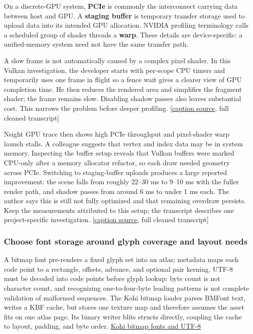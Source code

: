 \hypertarget{06-engine-ii-ch026-use-controlled-simplification-and-hardware-counters-to-find-a-gpu-bottleneck}{}

On a discrete-GPU system, \textbf{PCIe} is commonly the interconnect carrying data between host and GPU. A \textbf{staging buffer} is temporary transfer storage used to upload data into its intended GPU allocation. NVIDIA profiling terminology calls a scheduled group of shader threads a \textbf{warp}. These details are device-specific: a unified-memory system need not have the same transfer path.

A slow frame is not automatically caused by a complex pixel shader. In this Vulkan investigation, the developer starts with per-scope CPU timers and temporarily uses one frame in flight so a fence wait gives a clearer view of GPU completion time. He then reduces the rendered area and simplifies the fragment shader; the frame remains slow. Disabling shadow passes also leaves substantial cost. This narrows the problem before deeper profiling. {[}\href{https://www.youtube.com/watch?v=bUUZ1iD9_e4}{caption source}, full cleaned transcript{]}

Nsight GPU trace then shows high PCIe throughput and pixel-shader warp launch stalls. A colleague suggests that vertex and index data may be in system memory. Inspecting the buffer setup reveals that Vulkan buffers were marked CPU-only after a memory allocator refactor, so each draw needed geometry across PCIe. Switching to staging-buffer uploads produces a large reported improvement: the scene falls from roughly 22--30 ms to 9--10 ms with the fuller render path, and shadow passes from around 6 ms to under 1 ms each. The author says this is still not fully optimized and that remaining overdraw persists. Keep the measurements attributed to this setup; the transcript describes one project-specific investigation. {[}\href{https://www.youtube.com/watch?v=bUUZ1iD9_e4}{caption source}, full cleaned transcript{]}

\subsubsection{Choose font storage around glyph coverage and layout needs}\label{06-engine-ii-ch026-choose-font-storage-around-glyph-coverage-and-layout-needs}

\hypertarget{06-engine-ii-ch026-choose-font-storage-around-glyph-coverage-and-layout-needs}{}

A bitmap font pre-renders a fixed glyph set into an atlas; metadata maps each code point to a rectangle, offsets, advance, and optional pair kerning. UTF-8 must be decoded into code points before glyph lookup: byte count is not character count, and recognizing one-to-four-byte leading patterns is not complete validation of malformed sequences. The Kohi bitmap loader parses BMFont text, writes a KBF cache, but stores one texture map and therefore assumes the asset fits on one atlas page. Its binary writer blits structs directly, coupling the cache to layout, padding, and byte order. \href{https://www.youtube.com/watch?v=zvGIp-S2mxA}{Kohi bitmap fonts and UTF-8}

